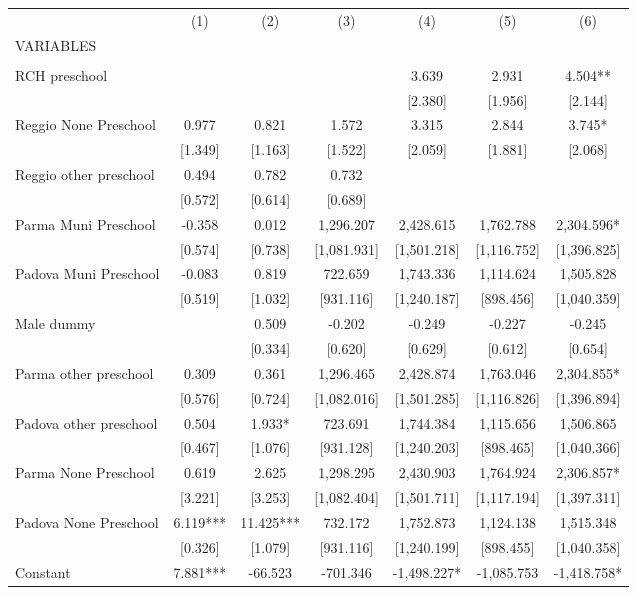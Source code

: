 \begin{tabular}{lcccccc} \hline
 & (1) & (2) & (3) & (4) & (5) & (6) \\
VARIABLES &  &  &  &  &  &  \\ \hline
 &  &  &  &  &  &  \\
RCH preschool &  &  &  & 3.639 & 2.931 & 4.504** \\
 &  &  &  & [2.380] & [1.956] & [2.144] \\
Reggio None Preschool & 0.977 & 0.821 & 1.572 & 3.315 & 2.844 & 3.745* \\
 & [1.349] & [1.163] & [1.522] & [2.059] & [1.881] & [2.068] \\
Reggio other preschool & 0.494 & 0.782 & 0.732 &  &  &  \\
 & [0.572] & [0.614] & [0.689] &  &  &  \\
Parma Muni Preschool & -0.358 & 0.012 & 1,296.207 & 2,428.615 & 1,762.788 & 2,304.596* \\
 & [0.574] & [0.738] & [1,081.931] & [1,501.218] & [1,116.752] & [1,396.825] \\
Padova Muni Preschool & -0.083 & 0.819 & 722.659 & 1,743.336 & 1,114.624 & 1,505.828 \\
 & [0.519] & [1.032] & [931.116] & [1,240.187] & [898.456] & [1,040.359] \\
Male dummy &  & 0.509 & -0.202 & -0.249 & -0.227 & -0.245 \\
 &  & [0.334] & [0.620] & [0.629] & [0.612] & [0.654] \\
Parma other preschool & 0.309 & 0.361 & 1,296.465 & 2,428.874 & 1,763.046 & 2,304.855* \\
 & [0.576] & [0.724] & [1,082.016] & [1,501.285] & [1,116.826] & [1,396.894] \\
Padova other preschool & 0.504 & 1.933* & 723.691 & 1,744.384 & 1,115.656 & 1,506.865 \\
 & [0.467] & [1.076] & [931.128] & [1,240.203] & [898.465] & [1,040.366] \\
Parma None Preschool & 0.619 & 2.625 & 1,298.295 & 2,430.903 & 1,764.924 & 2,306.857* \\
 & [3.221] & [3.253] & [1,082.404] & [1,501.711] & [1,117.194] & [1,397.311] \\
Padova None Preschool & 6.119*** & 11.425*** & 732.172 & 1,752.873 & 1,124.138 & 1,515.348 \\
 & [0.326] & [1.079] & [931.116] & [1,240.199] & [898.455] & [1,040.358] \\
Constant & 7.881*** & -66.523 & -701.346 & -1,498.227* & -1,085.753 & -1,418.758* \\

\end{tabular}
